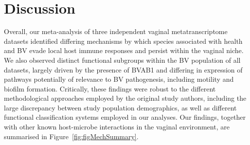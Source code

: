 \documentclass[sn-mathphys,Numbered]{sn-jnl}%
\begin{document}
\section{Discussion}\label{sec:secDisc}

Overall, our meta-analysis of three independent vaginal metatranscriptome datasets identified differing mechanisms by which species associated with health and BV evade local host immune responses and persist within the vaginal niche. We also observed distinct functional subgroups within the BV population of all datasets, largely driven by the presence of BVAB1 and differing in expression of pathways potentially of relevance to BV pathogenesis, including motility and biofilm formation. Critically, these findings were robust to the different methodological approaches employed by the original study authors, including the large discrepancy between study population demographics, as well as different functional classification systems employed in our analyses. Our findings, together with other known host-microbe interactions in the vaginal environment, are summarised in Figure~\ref{fig:figMechSummary}.
\end{document}

